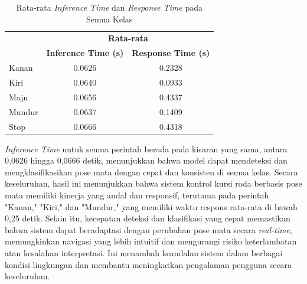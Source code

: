 \begin{longtable}{|l|cc|}
  \caption{Rata-rata \emph{Inference Time} dan \emph{Response Time} pada Semua Kelas}
  \label{tb:rata2delay} \\
  \hline
  \rowcolor[HTML]{D0D0D0} 
  \multicolumn{1}{|c|}{\cellcolor[HTML]{D0D0D0}}                                 & \multicolumn{2}{c|}{\cellcolor[HTML]{D0D0D0}\textbf{Rata-rata}}                                       \\ \cline{2-3} 
  \rowcolor[HTML]{D0D0D0} 
  \multicolumn{1}{|c|}{\multirow{-2}{*}{\cellcolor[HTML]{D0D0D0}\textbf{Kelas}}} & \multicolumn{1}{c|}{\cellcolor[HTML]{D0D0D0}\textbf{Inference Time (s)}} & \textbf{Response Time (s)} \\ \hline
  Kanan                                                                          & \multicolumn{1}{c|}{0.0626}                                              & 0.2328                     \\ \hline
  Kiri                                                                           & \multicolumn{1}{c|}{0.0640}                                              & 0.0933                     \\ \hline
  Maju                                                                           & \multicolumn{1}{c|}{0.0656}                                              & 0.4337                     \\ \hline
  Mundur                                                                         & \multicolumn{1}{c|}{0.0637}                                              & 0.1409                     \\ \hline
  Stop                                                                           & \multicolumn{1}{c|}{0.0666}                                              & 0.4318                     \\ \hline
\end{longtable}

\emph{Inference Time} untuk semua perintah berada pada kisaran yang sama, antara 0,0626 hingga 0,0666 detik, menunjukkan bahwa model dapat mendeteksi dan mengklasifikasikan pose mata dengan cepat dan konsisten di semua kelas. Secara keseluruhan, hasil ini menunjukkan bahwa sistem kontrol kursi roda berbasis pose mata memiliki kinerja yang andal dan responsif, terutama pada perintah "Kanan," "Kiri," dan "Mundur," yang memiliki waktu respons rata-rata di bawah 0,25 detik. Selain itu, kecepatan deteksi dan klasifikasi yang cepat memastikan bahwa sistem dapat beradaptasi dengan perubahan pose mata secara \emph{real-time}, memungkinkan navigasi yang lebih intuitif dan mengurangi risiko keterlambatan atau kesalahan interpretasi. Ini menambah keandalan sistem dalam berbagai kondisi lingkungan dan membantu meningkatkan pengalaman pengguna secara keseluruhan.

